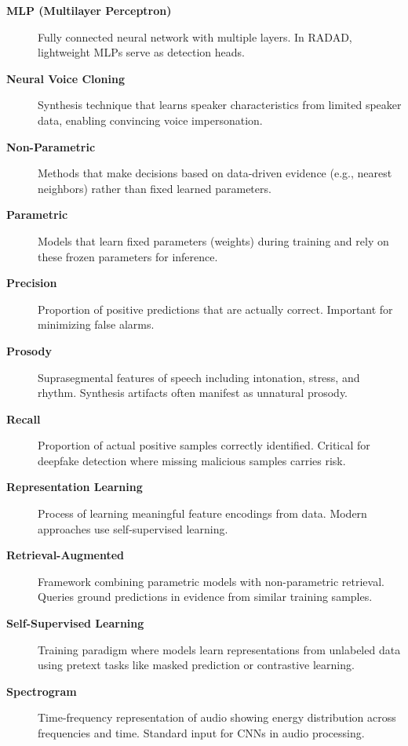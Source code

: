 \begin{description}
    \item[\textbf{MLP (Multilayer Perceptron)}] 
    Fully connected neural network with multiple layers. In RADAD, lightweight MLPs serve as detection heads.
    
    \item[\textbf{Neural Voice Cloning}] 
    Synthesis technique that learns speaker characteristics from limited speaker data, enabling convincing voice impersonation.
    
    \item[\textbf{Non-Parametric}] 
    Methods that make decisions based on data-driven evidence (e.g., nearest neighbors) rather than fixed learned parameters.
    
    \item[\textbf{Parametric}] 
    Models that learn fixed parameters (weights) during training and rely on these frozen parameters for inference.
    
    \item[\textbf{Precision}] 
    Proportion of positive predictions that are actually correct. Important for minimizing false alarms.
    
    \item[\textbf{Prosody}] 
    Suprasegmental features of speech including intonation, stress, and rhythm. Synthesis artifacts often manifest as unnatural prosody.
    
    \item[\textbf{Recall}] 
    Proportion of actual positive samples correctly identified. Critical for deepfake detection where missing malicious samples carries risk.
    
    \item[\textbf{Representation Learning}] 
    Process of learning meaningful feature encodings from data. Modern approaches use self-supervised learning.
    
    \item[\textbf{Retrieval-Augmented}] 
    Framework combining parametric models with non-parametric retrieval. Queries ground predictions in evidence from similar training samples.
    
    \item[\textbf{Self-Supervised Learning}] 
    Training paradigm where models learn representations from unlabeled data using pretext tasks like masked prediction or contrastive learning.
    
    \item[\textbf{Spectrogram}] 
    Time-frequency representation of audio showing energy distribution across frequencies and time. Standard input for CNNs in audio processing.
    

\end{description}
